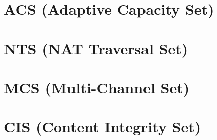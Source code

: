 \section{ACS (Adaptive Capacity Set)}


\section{NTS (NAT Traversal Set)}


\section{MCS (Multi-Channel Set)}


\section{CIS (Content Integrity Set)}


\begin{comment}

\end{comment}



